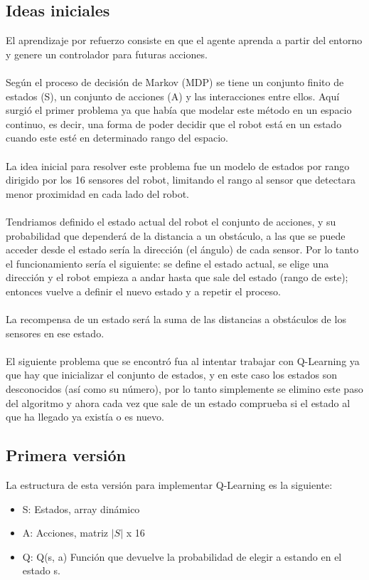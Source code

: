 \documentclass[14pt]{extarticle}
\theoremstyle{definition}
\theoremstyle{remark}
\begin{document}
\subsection{Ideas iniciales}\label{subsec:ideasiniciales}
El aprendizaje por refuerzo consiste en que el agente aprenda a partir del entorno y genere un controlador para futuras acciones.\\\\
Según el proceso de decisión de Markov (MDP) se tiene un conjunto finito de estados (S), un conjunto de acciones (A) y las interacciones entre ellos. Aquí surgió el primer problema ya que había que modelar este método en un espacio continuo, es decir, una forma de poder decidir que el robot está en un estado cuando este esté en determinado rango del espacio. \\\\
La idea inicial para resolver este problema fue un modelo de estados por rango dirigido por los 16 sensores del robot, limitando el rango al sensor que detectara menor proximidad en cada lado del robot.\\\\
Tendriamos definido el estado actual del robot el conjunto de acciones, y su probabilidad que dependerá de la distancia a un obstáculo, a las que se puede acceder desde el estado sería la dirección (el ángulo) de cada sensor. Por lo tanto el funcionamiento sería el siguiente: se define el estado actual, se elige una dirección y el robot empieza a andar hasta que sale del estado (rango de este); entonces vuelve a definir el nuevo estado y a repetir el proceso.\\\\
La recompensa de un estado será la suma de las distancias a obstáculos de los sensores en ese estado.\\\\
El siguiente problema que se encontró fua al intentar trabajar con Q-Learning ya que hay que inicializar el conjunto de estados, y en este caso los estados son desconocidos (así como su número), por lo tanto simplemente se elimino este paso del algoritmo y ahora cada vez que sale de un estado comprueba si el estado al que ha llegado ya existía o es nuevo.
\subsection{Primera versión}\label{subsec:primeraversion}
La estructura de esta versión para implementar Q-Learning es la siguiente:
\begin{itemize}
	\item S: Estados, array dinámico
	\item A: Acciones, matriz $|S|$ x 16
	\item Q: Q(s, a) Función que devuelve la probabilidad de elegir a estando en el estado s.
\end{itemize}
\end{document}
